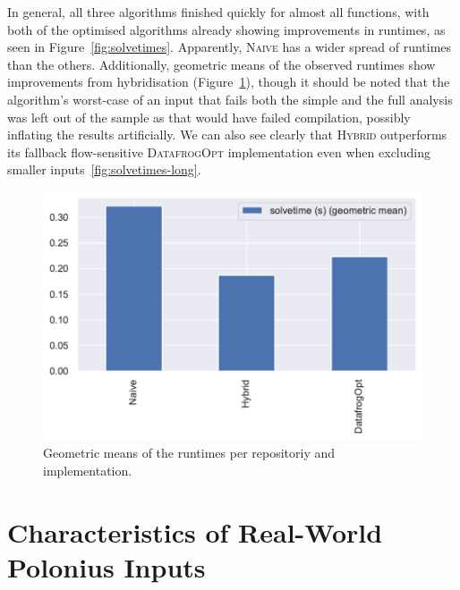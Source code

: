 \documentclass[11pt,a4paper,twoside,openany,draft]{report}
\begin{document}
In general, all three algorithms finished quickly for almost all functions, with
both of the optimised algorithms already showing improvements in runtimes, as
seen in Figure~\ref{fig:solvetimes}. Apparently, \textsc{Naive} has a wider
spread of runtimes than the others. Additionally, geometric means of the
observed runtimes show improvements from hybridisation
(Figure~\ref{fig:solvetimes-gmean-repo}), though it should be noted that the
algorithm's worst-case of an input that fails both the simple and the full
analysis was left out of the sample as that would have failed compilation,
possibly inflating the results artificially. We can also see clearly that
\textsc{Hybrid} outperforms its fallback flow-sensitive \textsc{DatafrogOpt}
implementation even when excluding smaller inputs~\ref{fig:solvetimes-long}.

\begin{figure}
  \includegraphics[width=0.5\linewidth]{Graphs/solvetimes_repo_gmean.pdf}
  \caption[Geometric Means of Runtimes Per Repository]{Geometric means of the
    runtimes per repositoriy and implementation.}\label{fig:solvetimes-gmean-repo}
\end{figure}


\section{Characteristics of Real-World Polonius Inputs}\label{sec:inputs:inputs}
\end{document}
